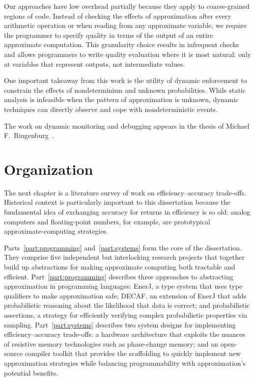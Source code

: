 Our approaches have low overhead partially because they apply to
coarse-grained regions of code. Instead of checking the effects of
approximation after every arithmetic operation or when reading from any
approximate variable, we require the programmer to specify quality in terms of
the output of an entire approximate computation. This granularity choice
results in infrequent checks and allows programmers to write quality
evaluation where it is most natural: only at variables that represent outputs, not intermediate
values.

One important takeaway from this work is the utility of dynamic enforcement
to constrain the effects of nondeterminism and unknown probabilities. While
static analysis is infeasible when the pattern of approximation is unknown,
dynamic techniques can directly observe and cope with nondeterministic events.


The work on dynamic monitoring and debugging appears in the thesis of
Michael F.\ Ringenburg~\cite{ringenburg-thesis}.


\section{Organization}

The next chapter is a literature survey of work on efficiency--accuracy
trade-offs.
Historical context is particularly important to this dissertation because the
fundamental idea of exchanging accuracy for returns in efficiency is so old:
analog computers and floating-point numbers, for example, are prototypical
approximate-computing strategies.

Parts~\ref{part:programming} and~\ref{part:systems} form the core of the
dissertation.
They comprise five independent but interlocking research projects that
together build up abstractions for making approximate computing both tractable
and efficient.
%
Part~\ref{part:programming} describes three approaches to abstracting
approximation in programming languages:
EnerJ, a type system that uses type qualifiers to make approximation safe;
DECAF, an extension of EnerJ that adds probabilistic reasoning
about the likelihood that data is correct;
and probabilistic assertions, a strategy for efficiently verifying complex
probabilistic properties via sampling.
%
Part~\ref{part:systems} describes two system designs for implementing
efficiency--accuracy trade-offs:
a hardware architecture that exploits the nuances of resistive memory
technologies such as phase-change memory;
and an open-source compiler toolkit that provides the scaffolding to quickly
implement new approximation strategies while balancing programmability with
approximation's potential benefits.

